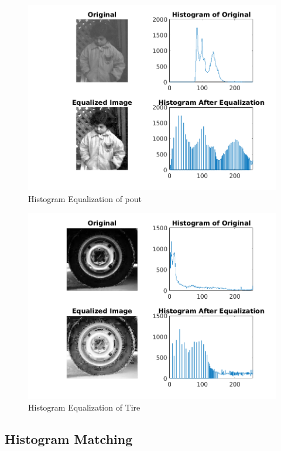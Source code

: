 \begin{figure}[H]
    \centering
    \includegraphics[scale=0.75]{pout_gray_equalize.png}
    \caption{Histogram Equalization of pout}
\end{figure}

\begin{figure}[H]
    \centering
    \includegraphics[scale=0.75]{Tire_gray_equalize.png}
    \caption{Histogram Equalization of Tire}
\end{figure}

\subsection{Histogram Matching}
